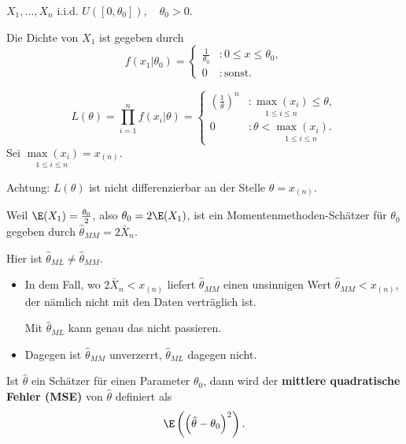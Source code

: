 \documentclass{tstextbook}
\begin{document}
\begin{example}
	$ X_1,\ldots,X_n $ i.i.d. $ U([0,\theta_0]), \quad \theta_0 > 0 $. 
	
	Die Dichte von $ X_1 $ ist gegeben durch 
	\[
	f(x_1|\theta_0)=\left\{\begin{array}{ll}
		\frac{1}{\theta_0} & \colon 0\le x\le \theta_0, \\
		0 & \colon \text{sonst} .
	\end{array}\right .
	\]
	
	
	\[
	L(\theta) = \prod_{i=1}^{n} f(x_i|\theta)=\left\{\begin{array}{ll}
		\left(\frac{1}{\theta}\right)^n & \colon \underset{1\le i\le n}{\max(x_i)} \le \theta, \\
		0 & \colon \theta < \underset{1\le i\le n}{\max(x_i)} .
	\end{array}\right .
	\]
	Sei $ \underset{1\le i\le n}{\max(x_i)} = x_{(n)} $. 
	
	Achtung: $ L(\theta) $ ist nicht differenzierbar an der Stelle $ \theta = x_{(n)} $. 
	
	Weil $ \E(X_1) = \frac{\theta_0}{2} $, also $ \theta_0 = 2 \E (X_1) $, ist ein Momentenmethoden-Schätzer für $ \theta_0 $ gegeben durch $ \hat{\theta}_{MM} = 2 \bar{X}_n $.
	
	Hier ist $ \hat{\theta}_{ML} \ne \hat{\theta}_{MM} $.
	
	\begin{itemize}
		\item In dem Fall, wo $ 2\bar{X}_n < x_{(n)} $ liefert $ \hat{\theta}_{MM} $ einen unsinnigen Wert $ \hat{\theta}_{MM} < x_{(n)} $, der nämlich nicht mit den Daten verträglich ist. 
		
		Mit $ \hat{\theta}_{ML} $ kann genau das nicht passieren.
		\item Dagegen ist $ \hat{\theta}_{MM} $ unverzerrt, $ \hat{\theta}_{ML} $ dagegen nicht.
	\end{itemize}
	
\end{example}

\begin{definition}
	Ist $ \hat{\theta} $ ein Schätzer für einen Parameter $ \theta_0 $, dann wird der \textbf{mittlere quadratische Fehler (MSE)}  von $ \hat{\theta} $ definiert als 
	\[
	\E\left(\left(\hat{\theta}-\theta_0\right)^2\right).
	\]
\end{definition}
\end{document}
